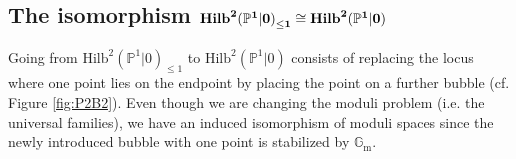 \documentclass[10.5pt]{amsart}
\theoremstyle{definition}
\theoremstyle{definition}
\theoremstyle{definition}
\theoremstyle{definition}
\newcommand{\Gm}{\mathbb{G}_{\operatorname{m}}}
\newcommand{\PP}{\mathbb{P}}
\newcommand{\Hilb}{\mathrm{Hilb}}
\newcommand{\ra}{\rightarrow}
\newcommand{\TS}[1]{{\color{pink} #1}}
\begin{document}
\subsection{The isomorphism $\textbf{\text{Hilb}}^{\boldsymbol{2}}{(\boldsymbol{\PP^1}|\boldsymbol{0})}_{\leq \mathbf{1}}\cong\textbf{\text{Hilb}}^{\boldsymbol{2}}{(\boldsymbol{\PP^1}|\boldsymbol{0})}$}

Going from $\Hilb^2(\PP^1|0)_{\le 1}$ to $\Hilb^2(\PP^1|0)$ consists of replacing the locus where one point lies on the endpoint by placing the point on a further bubble (cf. Figure \ref{fig:P2B2}). Even though we are changing the moduli problem (i.e. the universal families), we have an induced isomorphism of moduli spaces since the newly introduced bubble with one point is stabilized by $\Gm$. 

\end{document}
